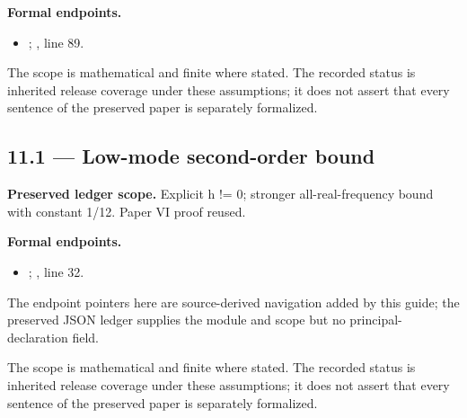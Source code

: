\textbf{Formal endpoints.}\begin{itemize}
\item {}; , line 89.
\end{itemize}
The scope is mathematical and finite where stated. The recorded status is inherited release coverage under these assumptions; it does not assert that every sentence of the preserved paper is separately formalized.

\subsection{11.1 — Low-mode second-order bound}
\label{result:11.1}
\textbf{Preserved ledger scope.} Explicit h != 0; stronger all-real-frequency bound with constant 1/12. Paper VI proof reused.

\textbf{Formal endpoints.}\begin{itemize}
\item {}; , line 32.
\end{itemize}
The endpoint pointers here are source-derived navigation added by this guide; the preserved JSON ledger supplies the module and scope but no principal-declaration field.

The scope is mathematical and finite where stated. The recorded status is inherited release coverage under these assumptions; it does not assert that every sentence of the preserved paper is separately formalized.

